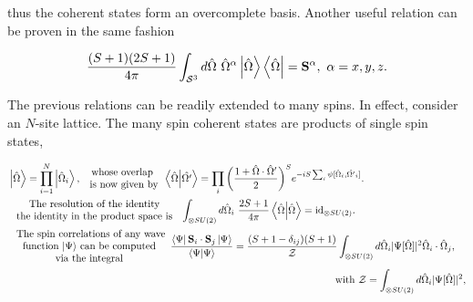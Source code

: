 \documentclass{homework}
\begin{document}
thus the coherent states form an overcomplete basis. Another useful relation can be proven in the same fashion 

\begin{equation}
    \frac{(S+1)(2S+1)}{4\pi} \int_{\mathcal{S}^3} d\hat{\Omega} \textnormal{ } {\hat{\Omega}}^\alpha \ket{\hat{\Omega}} \bra{\hat{\Omega}} = {\bf S}^{\alpha}, \textnormal{ } \alpha = x,y,z.
    \label{spin_coherent_resol_spin_ops}
\end{equation}

The previous relations can be readily extended to many spins. In effect, consider an $N$-site lattice. The many spin coherent states are products of single spin states, 

\begin{equation}
\begin{split}
    &\ket{\hat{\Omega}} = \prod_{i=1}^N \ket{\hat{\Omega}_i}, \begin{array}{c}
         \textnormal{ whose overlap }  \\
         \textnormal{ is now given by}
    \end{array} \bra{\hat{\Omega}}\ket{\hat{\Omega'}} = \prod_{i} \bigg(\frac{1 + \hat{\Omega} \cdot \hat{\Omega}'}{2} \bigg)^S e^{-iS \sum_{i} \psi[\hat{\Omega}_i, \hat{\Omega'}_i]}. \\
    & \begin{array}{c}
         \textnormal{ The resolution of the identity }  \\
         \textnormal{ the identity in the product space is } 
    \end{array} \int_{\otimes SU(2)} d\hat{\Omega}_i \blanky \frac{2S+1}{4\pi} \bra{\hat{\Omega}} \ket{\hat{\Omega}} = \textnormal{id}_{\otimes SU(2)}. \\
    & \begin{array}{c}
         \textnormal{ The spin correlations of any wave}  \\
         \textnormal{ function $\ket{\Psi}$ can be computed } \\
         \textnormal{ via the integral }
    \end{array} \frac{\bra{\Psi} \spin_i \cdot \spin_j \ket{\Psi}}{\bra{\Psi} \ket{\Psi}} = \frac{(S+1 - \delta_{ij})(S+1)}{\mathcal{Z}} \int_{\otimes SU(2)} d\hat{\Omega}_i |\Psi[\hat{\Omega}]|^2 \hat{\Omega}_i \cdot \hat{\Omega}_j, \\
    & \blanky\blanky\blanky\blanky\blanky\blanky\blanky\blanky\blanky\blanky\blanky\blanky\blanky\blanky\blanky\blanky\blanky\blanky\blanky\blanky\blanky\blanky\blanky\blanky\blanky\blanky\blanky\blanky\blanky\blanky\blanky\blanky \blanky\blanky\blanky\blanky\blanky\blanky\blanky\blanky\blanky\blanky\blanky\blanky\blanky\blanky\blanky\blanky\blanky\blanky\blanky\blanky\blanky\blanky\blanky\blanky\blanky\blanky\blanky\blanky\blanky\blanky\blanky\blanky \blanky\blanky\blanky\blanky\blanky\blanky\blanky\blanky\blanky\blanky\blanky\blanky\blanky\blanky\blanky\blanky\blanky\blanky\blanky\blanky\blanky\blanky\blanky\blanky\blanky\blanky\blanky\blanky\blanky\blanky\blanky\blanky \textnormal{ with } \mathcal{Z} = \int_{\otimes SU(2)} d\hat{\Omega}_i |\Psi[\hat{\Omega}]|^2,

\end{split}
\end{equation}
\end{document}
